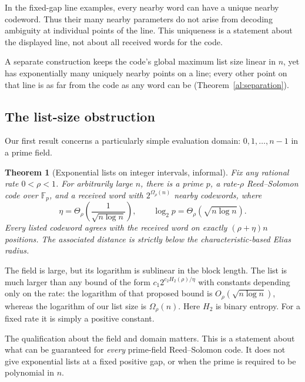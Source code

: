 \documentclass[11pt,letterpaper]{article}
\newtheorem{theorem}{Theorem}[section]
\theoremstyle{definition}
\theoremstyle{remark}
\newcommand{\F}{\mathbb F}
\begin{document}
In the fixed-gap line examples, every nearby word can have a unique
nearby codeword. Thus their many nearby parameters do not arise from
decoding ambiguity at individual points of the line. This uniqueness
is a statement about the displayed line, not about all received words
for the code.

A separate construction keeps the code's global maximum list size linear
in $n$, yet has exponentially many uniquely nearby points on a line;
every other point on that line is as far from the code as any word can be
(Theorem~\ref{al:separation}).

\subsection{The list-size obstruction}

Our first result concerns a particularly simple evaluation domain:
$0,1,\ldots,n-1$ in a prime field.

\begin{theorem}[Exponential lists on integer intervals, informal]
\label{thm:informal}
Fix any rational rate $0<\rho<1$. For arbitrarily large $n$, there is a
prime $p$, a rate-$\rho$ Reed--Solomon code over $\F_p$, and a received
word with $2^{\Omega_\rho(n)}$ nearby codewords, where
\[
 \eta=\Theta_\rho\!\left(\frac{1}{\sqrt{n\log n}}\right),
 \qquad \log_2p=\Theta_\rho(\sqrt{n\log n}).
\]
Every listed codeword agrees with the received word on exactly
$(\rho+\eta)n$ positions. The associated distance is strictly below
the characteristic-based Elias radius.
\end{theorem}

The field is large, but its logarithm is sublinear in the block length.
The list is much larger than any bound of the form
$c_1 2^{c_2 H_2(\rho)/\eta}$ with constants depending only on the rate:
the logarithm of that proposed bound is $O_\rho(\sqrt{n\log n})$,
whereas the logarithm of our list size is $\Omega_\rho(n)$.
Here $H_2$ is binary entropy. For a fixed rate it is simply a positive
constant.

The qualification about the field and domain matters. This is a
statement about what can be guaranteed for \emph{every} prime-field
Reed--Solomon code. It does not give exponential lists at a fixed
positive gap, or when the prime is required to be polynomial in $n$.
\end{document}
